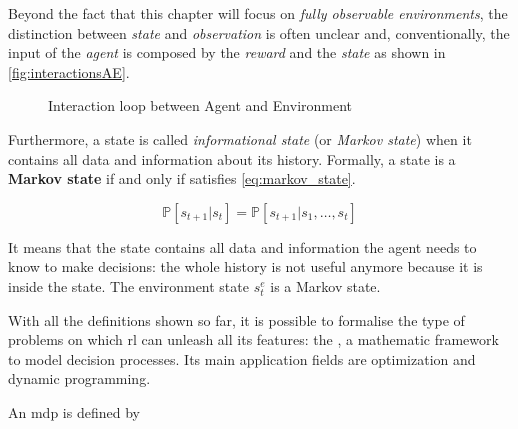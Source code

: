 Beyond the fact that this chapter will focus on \textit{fully observable environments}, the distinction between \textit{state} and \textit{observation} is often unclear and, conventionally, the input of the \textit{agent} is composed by the \textit{reward} and the \textit{state} as shown in \vref{fig:interactionsAE}.

\begin{figure}
	\centering
	\caption[Interaction loop between Agent and Environment]{Interaction loop between Agent and Environment}
	\label{fig:interactionsAE}
\end{figure}


Furthermore, a state is called \textit{informational state} (or \textit{Markov state}) when it contains all data and information about its history. Formally, a state is a \textbf{Markov state} if and only if satisfies \vref{eq:markov_state}.

\begin{equation} \label{eq:markov_state}
	\mathbb{P}[s_{t+1}| s_t] = \mathbb{P}[s_{t+1} | s_1, \dots, s_t]
\end{equation}

 It means that the state contains all data and information the agent needs to know to make decisions: the whole history is not useful anymore because it is inside the state. The environment state $s_t^e$ is a Markov state.
 
 With all the definitions shown so far, it is possible to formalise the type of problems on which \gls{rl} can unleash all its features: the \textbf{}, a mathematic framework to model decision processes. Its main application fields are optimization and dynamic programming.
 
 An \gls{mdp} is defined by 

